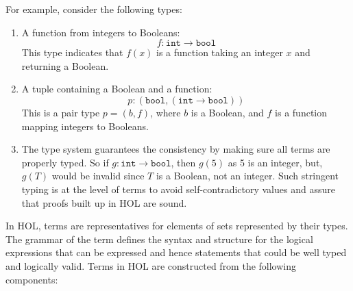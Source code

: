 For example, consider the following types:
\begin{enumerate}
    \item A function from integers to Booleans:
   \[
   f : \texttt{int} \to \texttt{bool}
   \]
   This type indicates that \(f(x)\) is a function taking an integer \(x\) and returning a Boolean.

    \item A tuple containing a Boolean and a function:
       \[
       p : (\texttt{bool}, (\texttt{int} \to \texttt{bool}))
       \]
       This is a pair type \(p = (b, f)\), where \(b\) is a Boolean, and \(f\) is a function mapping integers to Booleans.
       \item The type system guarantees the consistency by making sure all terms are properly typed. So if \(g : \texttt{int} \to \texttt{bool}\), then \(g(5)\) as 5 is an integer, but, \(g(T)\) would be invalid since \(T\) is a Boolean, not an integer. Such stringent typing is at the level of terms to avoid self-contradictory values and assure that proofs built up in HOL are sound.
\end{enumerate}

In HOL, terms are representatives for elements of sets represented by their types. The grammar of the term deﬁnes the syntax and structure for the logical expressions that can be expressed and hence statements that could be well typed and logically valid. Terms in HOL are constructed from the following components:


